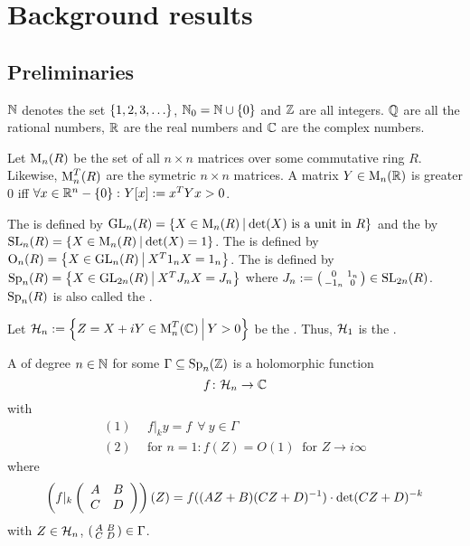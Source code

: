 
\section{Background results}

\subsection{Preliminaries}

$\mathbb{N}$ denotes the set $\Set{1,2,3,\dots}$, $\N_0 = \N \cup \Set{0}$ and $\mathbb{Z}$ are all integers. $\mathbb{Q}$ are all the rational numbers, $\mathbb{R}$ are the real numbers and $\mathbb{C}$ are the complex numbers.

Let $\operatorname{M}_n(R)$ be the set of all $n \times n$ matrices over some commutative ring $R$.
Likewise, $\operatorname{M}_n^T(R)$ are the symetric $n \times n$ matrices.
A matrix $Y \in \operatorname{M}_n(\mathbb{R})$ is greater $0$ iff $\forall x \in \R^n - \Set{0} \colon Y[x] := x^T Y x > 0$.

The  is defined by $\GL_n(R) = \Set{X \in \M_n(R)}{\text{$\det(X)$ is a unit in $R$}}$
and the  by $\SL_n(R) = \Set{X \in \M_n(R)}{\det(X) = 1}$. %
The  is defined by $\Orth_n(R) = \Set{X \in \GL_n(R)}{X^T 1_n X = 1_n}$. %
The  is defined by $\Sp_n(R) = \Set{X \in \GL_{2n}(R)}{X^T J_n X = J_n}$ %
where $J_n := \left( \begin{smallmatrix} 0 & 1_n \\ -1_n & 0 \end{smallmatrix} \right) \in \operatorname{SL}_{2n}(R)$. %
$\operatorname{Sp}_n(R)$ is also called the .

Let $\SiegelHalfPlane_n := \Set{Z = X + iY \in \M_n^T(\C)}{Y > 0}$ be the .
Thus, $\mathcal{H}_1$ is the .


A  of degree $n\in\mathbb{N}$ for some $\Gamma \subseteq \operatorname{Sp}_n(\mathbb{Z})$ is a holomorphic function
\[ f \colon \mathcal{H}_n \rightarrow \mathbb{C} \]
with
\begin{align*}
(1) \ \ & f |_k y = f \ \ \forall \ y \in \Gamma \\
(2) \ \ & \text{for } n = 1 \colon f(Z) = O(1) \ \text{ for } Z \rightarrow i \infty
\end{align*}
where
\[ \left( f|_k \left( \begin{array}{cc} A & B \\ C & D \end{array} \right) \right) (Z) =
f((AZ + B)(CZ + D)^{-1}) \cdot \det(CZ + D)^{-k} \]
with $Z \in \mathcal{H}_n$, $\left( \begin{smallmatrix} A & B \\ C & D \end{smallmatrix} \right) \in \Gamma$.

